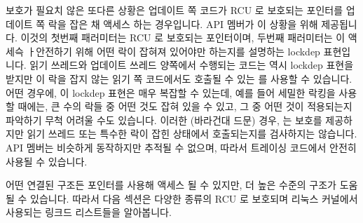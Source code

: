 보호가 필요치 않은 또다른 상황은 업데이트 쪽 코드가 RCU 로 보호되는 포인터를
업데이트 쪽 락을 잡은 채 액세스 하는 경우입니다.
 API 멤버가 이 상황을 위해 제공됩니다.
이것의 첫번째 패러미터는 RCU 로 보호되는 포인터이며, 두번째 패러미터는 이
액세슥 ㅏ안전하기 위해 어떤 락이 잡혀져 있어야만 하는지를 설명하는 lockdep
표현입니다.
읽기 쓰레드와 업데이트 쓰레드 양쪽에서 수행되는 코드는 역시 lockdep 표현을
받지만 이 락을 잡지 않는 읽기 쪽 코드에서도 호출될 수 있는
 를 사용할 수 있습니다.
어떤 경우에, 이 lockdep 표현은 매우 복잡할 수 있는데, 예를 들어 세밀한 락킹을
사용할 때에는, 큰 수의 락들 중 어떤 것도 잡혀 있을 수 있고, 그 중 어떤 것이
적용되는지 파악하기 무척 어려울 수도 있습니다.
이러한 (바라건대 드문) 경우,  는 보호를 제공하지만
읽기 쓰레드 또는 특수한 락이 잡힌 상태에서 호출되는지를 검사하지는 않습니다.
 API 멤버는 비슷하게 동작하지만 추적될 수
없으며, 따라서 트레이싱 코드에서 안전히 사용될 수 있습니다.

어떤 연결된 구조든 포인터를 사용해 액세스 될 수 있지만, 더 높은 수준의 구조가
도움될 수 있습니다.
따라서 다음 섹션은 다양한 종류의 RCU 로 보호되며 리눅스 커널에서 사용되는
링크드 리스트들을 알아봅니다.

\iffalse

